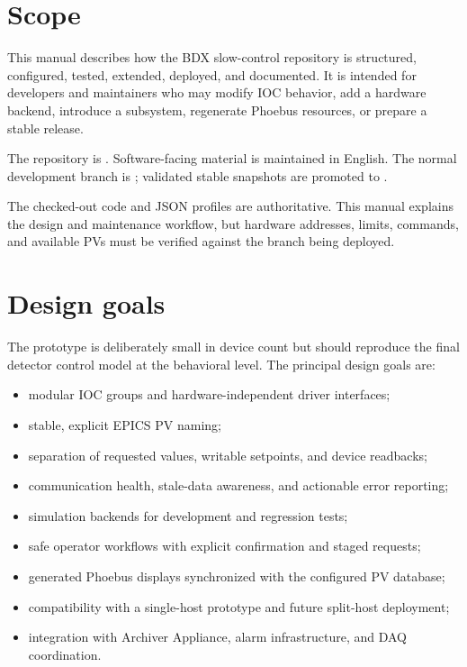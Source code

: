 \section{Scope}

This manual describes how the BDX slow-control repository is structured, configured, tested, extended, deployed, and documented. It is intended for developers and maintainers who may modify IOC behavior, add a hardware backend, introduce a subsystem, regenerate Phoebus resources, or prepare a stable release.

The repository is \repo. Software-facing material is maintained in English. The normal development branch is ; validated stable snapshots are promoted to .

\begin{importantbox}
The checked-out code and JSON profiles are authoritative. This manual explains the design and maintenance workflow, but hardware addresses, limits, commands, and available PVs must be verified against the branch being deployed.
\end{importantbox}

\section{Design goals}

The prototype is deliberately small in device count but should reproduce the final detector control model at the behavioral level. The principal design goals are:

\begin{itemize}
  \item modular IOC groups and hardware-independent driver interfaces;
  \item stable, explicit EPICS PV naming;
  \item separation of requested values, writable setpoints, and device readbacks;
  \item communication health, stale-data awareness, and actionable error reporting;
  \item simulation backends for development and regression tests;
  \item safe operator workflows with explicit confirmation and staged requests;
  \item generated Phoebus displays synchronized with the configured PV database;
  \item compatibility with a single-host prototype and future split-host deployment;
  \item integration with Archiver Appliance, alarm infrastructure, and DAQ coordination.
\end{itemize}

